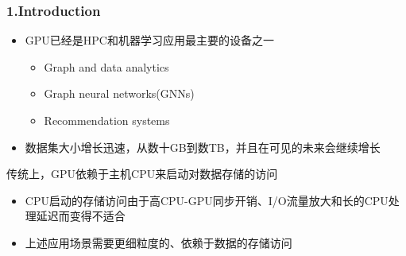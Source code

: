 \documentclass[10pt]{ctexbeamer}
\begin{document}
\begin{frame}[t]
  \frametitle{1.Introduction}
  \begin{itemize}
    \item GPU已经是HPC和机器学习应用最主要的设备之一
    \begin{itemize}
      \item Graph and data analytics
      \item Graph neural networks(GNNs)
      \item Recommendation systems
    \end{itemize}
  \item 数据集大小增长迅速，从数十GB到数TB，并且在可见的未来会继续增长
  \end{itemize}

  \vfill
  \pause%
  传统上，GPU依赖于主机CPU来启动对数据存储的访问
  \begin{itemize}
    \item CPU启动的存储访问由于高CPU-GPU同步开销、I/O流量放大和长的CPU处理延迟而变得不适合
    \item 上述应用场景需要更细粒度的、依赖于数据的存储访问
  \end{itemize}
\end{frame}
\end{document}
